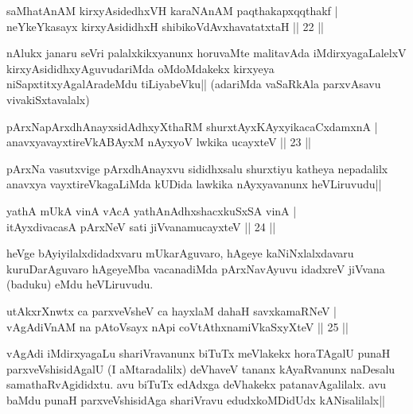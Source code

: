
\begin{shl}
saMhatAnAM kirxyAsidedhxVH karaNAnAM paqthakapxqqthakf | \\
neYkeYkasayx kirxyAsididhxH shibikoVdAvxhavatatxtaH \hfill|| 22 || 
\end{shl}

\begin{artha}
nAlukx janaru seVri palalxkikxyanunx horuvaMte malitavAda 
iMdirxyagaLalelxV kirxyAsididhxyAguvudariMda oMdoMdakekx kirxyeya 
niSapxtitxyAgalAradeMdu tiLiyabeVku|| (adariMda vaSaRkAla parxvAsavu 
vivakiSxtavalalx)
\end{artha}

\begin{shl}
pArxNapArxdhAnayxsidAdhxyXthaRM shurxtAyx\s \s KAyxyikacaCxdamxnA | \\
anavxyavayxtireVkABAyxM nAyxyoV lwkika ucayxteV \hfill|| 23 || 
\end{shl}

\begin{artha}
pArxNa vasutxvige pArxdhAnayxvu sididhxsalu shurxtiyu katheya 
nepadalilx anavxya vayxtireVkagaLiMda kUDida lawkika nAyxyavanunx 
heVLiruvudu||
\end{artha}


\begin{shl}
yathA mUkA vinA vAcA yathA\s nAdhxshacxkuSxSA vinA | \\
itAyxdivacasA pArxNeV sati jiVvanamucayxteV \hfill|| 24 || 
\end{shl}

\begin{artha}
heVge bAyiyilalxdidadxvaru mUkarAguvaro, hAgeye kaNiNxlalxdavaru 
kuruDarAguvaro hAgeyeMba vacanadiMda pArxNavAyuvu idadxreV jiVvana 
(baduku) eMdu heVLiruvudu.
\end{artha}

\begin{shl}
utAkxrXnwtx ca parxveVsheV ca hayxlaM dahaH savxkamaRNeV | \\
vAgAdiVnAM na pAtoV\s sayx nApi coVtAthxnamiVkaSxyXteV \hfill|| 25 || 
\end{shl}

\begin{artha}
vAgAdi iMdirxyagaLu shariVravanunx biTuTx meVlakekx horaTAgalU punaH 
parxveVshisidAgalU (I aMtaradalilx) deVhaveV tananx kAyaRvanunx 
naDesalu samathaRvAgididxtu. avu biTuTx edAdxga deVhakekx 
patanavAgalilalx. avu baMdu punaH parxveVshisidAga shariVravu 
edudxkoMDidUdx kANisalilalx||
\end{artha}

